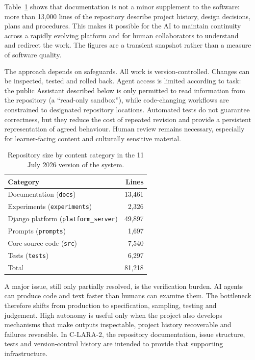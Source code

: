 \documentclass[11pt,a4paper]{article}
\begin{document}
Table~\ref{tab:repository-size} shows that documentation is not a minor supplement to the software: more than 13,000 lines of the repository describe project history, design decisions, plans and procedures. This makes it possible for the AI to maintain continuity across a rapidly evolving platform and for human collaborators to understand and redirect the work. The figures are a transient snapshot rather than a measure of software quality.

The approach depends on safeguards. All work is version-controlled. Changes can be inspected, tested and rolled back. Agent access is limited according to task: the public Assistant described below is only permitted to read information from the repository (a ``read-only sandbox''), while code-changing workflows are constrained to designated repository locations. Automated tests do not guarantee correctness, but they reduce the cost of repeated revision and provide a persistent representation of agreed behaviour. Human review remains necessary, especially for learner-facing content and culturally sensitive material.

\begin{table}[htbp]
\centering
\caption{Repository size by content category in the 11 July 2026 version of the system.}
\label{tab:repository-size}
\begin{tabular}{@{}lr@{}}
\toprule
\textbf{Category} & \textbf{Lines} \\
\midrule
Documentation (\texttt{docs}) & 13,461 \\
Experiments (\texttt{experiments}) & 2,326 \\
Django platform (\texttt{platform\_server}) & 49,897 \\
Prompts (\texttt{prompts}) & 1,697 \\
Core source code (\texttt{src}) & 7,540 \\
Tests (\texttt{tests}) & 6,297 \\
\midrule
Total & 81,218 \\
\bottomrule
\end{tabular}
\end{table}

A major issue, still only partially resolved, is the verification burden. AI agents can produce code and text faster than humans can examine them. The bottleneck therefore shifts from production to specification, sampling, testing and judgement. High autonomy is useful only when the project also develops mechanisms that make outputs inspectable, project history recoverable and failures reversible. In C-LARA-2, the repository documentation, issue structure, tests and version-control history are intended to provide that supporting infrastructure.
\end{document}

